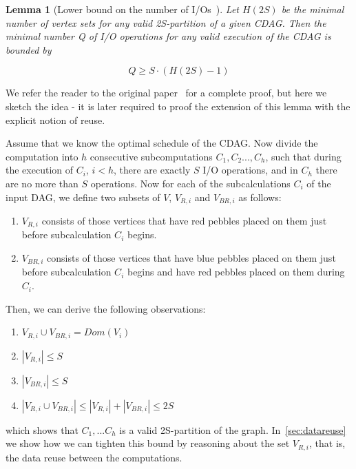 \documentclass[sigplan,review,anonymous]{acmart}\settopmatter{printfolios=true,printccs=false,printacmref=false}
\newtheorem{lma}{Lemma}
\begin{document}
\begin{lma}[Lower bound on the number of I/Os~\cite{redblue}]
	Let $H(2S)$ be the minimal number of vertex sets for any valid 2S-partition 
	of
	a given CDAG. Then the minimal number Q of I/O operations for any valid
	execution of the CDAG is bounded by
	
	\begin{equation}
	\label{eq:redbluebound}
	Q \ge S \cdot (H(2S) - 1)
	\end{equation}
\end{lma}

We refer the reader to the original paper~\cite{c} for a complete proof, but 
here we sketch the idea - it is later required to proof the extension of this 
lemma with the explicit notion of reuse. 

Assume that we know the optimal schedule of the
CDAG. Now divide the computation into $h$ consecutive subcomputations $C_1,
C_2..., C_h$, such that during the execution of $C_i$, $i < h$, there are
exactly $S$ I/O operations, and in $C_h$ there are no more than $S$
operations. Now for each of the subcalculations $C_i$ of the input DAG, we
define two subsets of $V$, $V_{R,i}$ and $V_{BR,i}$ as follows:

\begin{enumerate}
	\item $V_{R,i}$ consists of those vertices that have red pebbles placed on 
	them
	just before subcalculation $C_i$ begins.
	\item $V_{BR,i}$ consists of those vertices that have blue pebbles placed on
	them just before subcalculation $C_i$ begins and have red pebbles placed on
	them during $C_i$.
\end{enumerate}

Then, we can derive the following observations:

\begin{enumerate}
	\item $V_{R,i} \cup V_{BR,i} = Dom(V_i)$
	\item $|V_{R,i}| \le S$
	\item $|V_{BR,i}| \le S$
	\item $|V_{R,i} \cup V_{BR,i}| \le |V_{R,i}| + |V_{BR,i}| \le 2S$
\end{enumerate}

%
which shows that $C_1, ...C_h$ is a valid 2S-partition of the graph.
In~\cref{sec:datareuse} we show how we can tighten this bound by 
reasoning about the set $V_{R,i}$, that is, the data reuse between the 
computations. 
\end{document}
